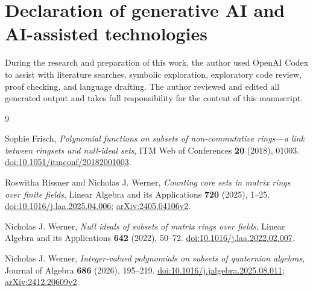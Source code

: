 \documentclass[11pt]{article}
\theoremstyle{remark}
\numberwithin{equation}{section}
\begin{document}
\section*{Declaration of generative AI and AI-assisted technologies}

During the research and preparation of this work, the author used OpenAI
Codex to assist with literature searches, symbolic exploration, exploratory
code review, proof checking, and language drafting. The author reviewed and
edited all generated output and takes full responsibility for the content of
this manuscript.


\begin{thebibliography}{9}

Sophie Frisch,
\emph{Polynomial functions on subsets of non-commutative rings---a link between ringsets and null-ideal sets},
ITM Web of Conferences \textbf{20} (2018), 01003.
\href{https://doi.org/10.1051/itmconf/20182001003}{doi:10.1051/itmconf/20182001003}.

Roswitha Rissner and Nicholas J. Werner,
\emph{Counting core sets in matrix rings over finite fields},
Linear Algebra and its Applications \textbf{720} (2025), 1--25.
\href{https://doi.org/10.1016/j.laa.2025.04.006}{doi:10.1016/j.laa.2025.04.006};
\href{https://arxiv.org/abs/2405.04106}{arXiv:2405.04106v2}.

Nicholas J. Werner,
\emph{Null ideals of subsets of matrix rings over fields},
Linear Algebra and its Applications \textbf{642} (2022), 50--72.
\href{https://doi.org/10.1016/j.laa.2022.02.007}{doi:10.1016/j.laa.2022.02.007}.

Nicholas J. Werner,
\emph{Integer-valued polynomials on subsets of quaternion algebras},
Journal of Algebra \textbf{686} (2026), 195--219.
\href{https://doi.org/10.1016/j.jalgebra.2025.08.011}{doi:10.1016/j.jalgebra.2025.08.011};
\href{https://arxiv.org/abs/2412.20609}{arXiv:2412.20609v2}.

\end{thebibliography}
\end{document}
